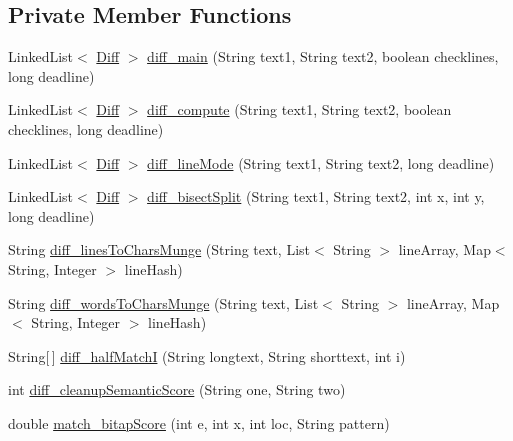 \subsection*{Private Member Functions}
\begin{DoxyCompactItemize}
\item 
Linked\+List$<$ \hyperlink{classorg_1_1buildmlearn_1_1toolkit_1_1utilities_1_1diff__match__patch_1_1Diff}{Diff} $>$ \hyperlink{classorg_1_1buildmlearn_1_1toolkit_1_1utilities_1_1diff__match__patch_ae1e07fddc2f23981f0b3a35284c289ae}{diff\+\_\+main} (String text1, String text2, boolean checklines, long deadline)
\item 
Linked\+List$<$ \hyperlink{classorg_1_1buildmlearn_1_1toolkit_1_1utilities_1_1diff__match__patch_1_1Diff}{Diff} $>$ \hyperlink{classorg_1_1buildmlearn_1_1toolkit_1_1utilities_1_1diff__match__patch_ae284979fa55d548cbf9989ebae4dc543}{diff\+\_\+compute} (String text1, String text2, boolean checklines, long deadline)
\item 
Linked\+List$<$ \hyperlink{classorg_1_1buildmlearn_1_1toolkit_1_1utilities_1_1diff__match__patch_1_1Diff}{Diff} $>$ \hyperlink{classorg_1_1buildmlearn_1_1toolkit_1_1utilities_1_1diff__match__patch_a0d175137ea26dae68871ad0c3cb619a0}{diff\+\_\+line\+Mode} (String text1, String text2, long deadline)
\item 
Linked\+List$<$ \hyperlink{classorg_1_1buildmlearn_1_1toolkit_1_1utilities_1_1diff__match__patch_1_1Diff}{Diff} $>$ \hyperlink{classorg_1_1buildmlearn_1_1toolkit_1_1utilities_1_1diff__match__patch_a0b65cab0c42398230df7d762fb0f7a70}{diff\+\_\+bisect\+Split} (String text1, String text2, int x, int y, long deadline)
\item 
String \hyperlink{classorg_1_1buildmlearn_1_1toolkit_1_1utilities_1_1diff__match__patch_ad2b31bf660320bf331ea4d0e3793bf70}{diff\+\_\+lines\+To\+Chars\+Munge} (String text, List$<$ String $>$ line\+Array, Map$<$ String, Integer $>$ line\+Hash)
\item 
String \hyperlink{classorg_1_1buildmlearn_1_1toolkit_1_1utilities_1_1diff__match__patch_a84ef353d2a83997f5bdcf76ba38c0647}{diff\+\_\+words\+To\+Chars\+Munge} (String text, List$<$ String $>$ line\+Array, Map$<$ String, Integer $>$ line\+Hash)
\item 
String\mbox{[}$\,$\mbox{]} \hyperlink{classorg_1_1buildmlearn_1_1toolkit_1_1utilities_1_1diff__match__patch_a6d6fe166f63595b1a113483a01dc8d88}{diff\+\_\+half\+MatchI} (String longtext, String shorttext, int i)
\item 
int \hyperlink{classorg_1_1buildmlearn_1_1toolkit_1_1utilities_1_1diff__match__patch_a2debe8436f2ad7c48bbb9dd2037d2f8e}{diff\+\_\+cleanup\+Semantic\+Score} (String one, String two)
\item 
double \hyperlink{classorg_1_1buildmlearn_1_1toolkit_1_1utilities_1_1diff__match__patch_ab8c8d7a0486aaa6ad1f7ecb4720632cc}{match\+\_\+bitap\+Score} (int e, int x, int loc, String pattern)
\end{DoxyCompactItemize}
